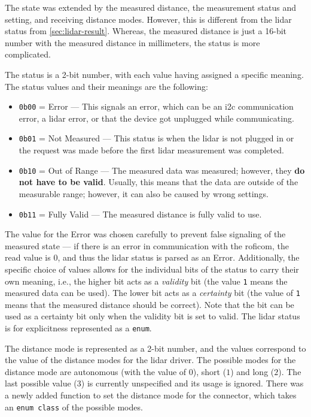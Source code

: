 \documentclass[
  digital,     %
  oneside,     %
  nosansbold,  %
  nocolorbold, %
  nolof,         %
  nolot,         %
]{fithesis4}
\begin{document}
{{{The state was extended by the measured distance, the measurement status and setting, and receiving distance modes. However, this is different from the \acrshort{lidar} status from \autoref{sec:lidar-result}. Whereas, the measured distance is just a 16-bit number with the measured distance in millimeters, the status is more complicated.

The status is a 2-bit number, with each value having assigned a specific meaning. The status values and their meanings are the following:
\begin{itemize}
    \item \lstinline|0b00| = Error --- This signals an error, which can be an \acrshort{i2c} communication error, a \acrshort{lidar} error, or that the device got unplugged while communicating.  
    \item \lstinline|0b01| = Not Measured --- This status is when the \acrshort{lidar} is not plugged in or the request was made before the first \acrshort{lidar} measurement was completed.
    \item \lstinline|0b10| = Out of Range --- The measured data was measured; however, they \textbf{do not have to be valid}. Usually, this means that the data are outside of the measurable range; however, it can also be caused by wrong settings.
    \item \lstinline|0b11| = Fully Valid --- The measured distance is fully valid to use.
\end{itemize}

The value for the Error was chosen carefully to prevent false signaling of the measured state --- if there is an error in communication with the \acrshort{roficom}, the read value is $0$, and thus the \acrshort{lidar} status is parsed as an Error. Additionally, the specific choice of values allows for the individual bits of the status to carry their own meaning, i.e., the higher bit acts as a \emph{validity} bit (the value \verb|1| means the measured data can be used). The lower bit acts as a \emph{certainty} bit (the value of \verb|1| means that the measured distance should be correct). Note that the bit can be used as a certainty bit only when the validity bit is set to valid. The \acrshort{lidar} status is for explicitness represented as a \lstinline|enum|.

The distance mode is represented as a 2-bit number, and the values correspond to the value of the distance modes for the \acrshort{lidar} driver. The possible modes for the distance mode are autonomous (with the value of $0$), short ($1$) and long ($2$). The last possible value ($3$) is currently unspecified and its usage is ignored. There was a newly added function to set the distance mode for the connector, which takes an \lstinline|enum class| of the possible modes.

}}}
\end{document}
